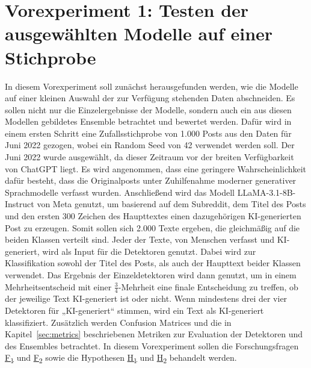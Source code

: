 \section{Vorexperiment 1: Testen der ausgewählten Modelle auf einer Stichprobe}
\label{subsec:Vorexperiment 1}
In diesem Vorexperiment soll zunächst herausgefunden werden, wie die Modelle auf einer kleinen Auswahl der zur Verfügung stehenden Daten abschneiden. Es sollen nicht nur die Einzelergebnisse der Modelle, sondern auch ein aus diesen Modellen gebildetes Ensemble betrachtet und bewertet werden. Dafür wird in einem ersten Schritt eine Zufallsstichprobe von 1.000 Posts aus den Daten für Juni 2022 gezogen, wobei ein Random Seed von 42 verwendet werden soll. Der Juni 2022 wurde ausgewählt, da dieser Zeitraum vor der breiten Verfügbarkeit von ChatGPT liegt. Es wird angenommen, dass eine geringere Wahrscheinlichkeit dafür besteht, dass die Originalposts unter Zuhilfenahme moderner generativer Sprachmodelle verfasst wurden. Anschließend wird das Modell LLaMA-3.1-8B-Instruct von Meta genutzt, um basierend auf dem Subreddit, dem Titel des Posts und den ersten 300 Zeichen des Haupttextes einen dazugehörigen KI-generierten Post zu erzeugen. Somit sollen sich 2.000 Texte ergeben, die gleichmäßig auf die beiden Klassen verteilt sind. Jeder der Texte, von Menschen verfasst und KI-generiert, wird als Input für die Detektoren genutzt. Dabei wird zur Klassifikation sowohl der Titel des Posts, als auch der Haupttext beider Klassen verwendet. Das Ergebnis der Einzeldetektoren wird dann genutzt, um in einem Mehrheitsentscheid mit einer \(\frac{3}{4}\)-Mehrheit eine finale Entscheidung zu treffen, ob der jeweilige Text KI-generiert ist oder nicht. Wenn mindestens drei der vier Detektoren für „KI-generiert“ stimmen, wird ein Text als KI-generiert klassifiziert. Zusätzlich werden Confusion Matrices und die in Kapitel~\ref{sec:metrics} beschriebenen Metriken zur Evaluation der Detektoren und des Ensembles betrachtet. In diesem Vorexperiment sollen die Forschungsfragen \hyperlink{rq:1}{F\textsubscript{1}} und \hyperlink{rq:2}{F\textsubscript{2}} sowie die Hypothesen \hyperlink{hp:1}{H\textsubscript{1}} und \hyperlink{hp:2}{H\textsubscript{2}} behandelt werden.

